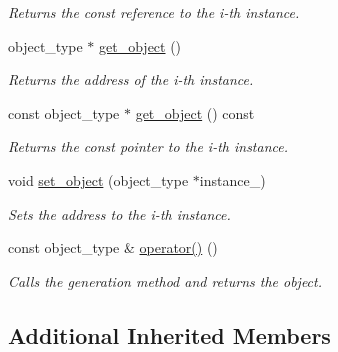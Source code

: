\begin{DoxyCompactItemize}
\begin{DoxyCompactList}\small\item\em Returns the const reference to the i-\/th instance. \end{DoxyCompactList}\item 
\hypertarget{a00365_ad457ac5a18021b250b551d2cc0a9a36b}{object\-\_\-type $\ast$ \hyperlink{a00365_ad457ac5a18021b250b551d2cc0a9a36b}{get\-\_\-object} ()}\label{a00365_ad457ac5a18021b250b551d2cc0a9a36b}

\begin{DoxyCompactList}\small\item\em Returns the address of the i-\/th instance. \end{DoxyCompactList}\item 
\hypertarget{a00365_af4bccdfea1d6de2f6303af197d7ebb31}{const object\-\_\-type $\ast$ \hyperlink{a00365_af4bccdfea1d6de2f6303af197d7ebb31}{get\-\_\-object} () const }\label{a00365_af4bccdfea1d6de2f6303af197d7ebb31}

\begin{DoxyCompactList}\small\item\em Returns the const pointer to the i-\/th instance. \end{DoxyCompactList}\item 
\hypertarget{a00365_a0a6a7b646a32759b475b67b4eb8ba400}{void \hyperlink{a00365_a0a6a7b646a32759b475b67b4eb8ba400}{set\-\_\-object} (object\-\_\-type $\ast$instance\-\_\-)}\label{a00365_a0a6a7b646a32759b475b67b4eb8ba400}

\begin{DoxyCompactList}\small\item\em Sets the address to the i-\/th instance. \end{DoxyCompactList}\item 
\hypertarget{a00365_a3e6283d3fc0d044feaf3e51f4878dc49}{const object\-\_\-type \& \hyperlink{a00365_a3e6283d3fc0d044feaf3e51f4878dc49}{operator()} ()}\label{a00365_a3e6283d3fc0d044feaf3e51f4878dc49}

\begin{DoxyCompactList}\small\item\em Calls the generation method and returns the object. \end{DoxyCompactList}\end{DoxyCompactItemize}
\subsection*{Additional Inherited Members}



